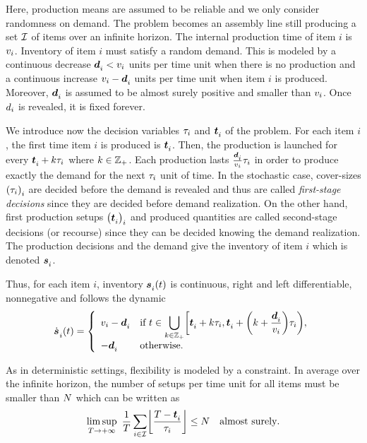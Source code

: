 Here, production means are assumed to be reliable and we only consider randomness on demand.
The problem becomes an assembly line still producing a set $\mathcal{I}$ of items over an infinite horizon.
The internal production time of item $i$ is $v_i$.
Inventory of item $i$ must satisfy a random demand.
This is modeled by a continuous decrease $\va\demand_i<\rate_i$ units per time unit when there is no production and a continuous increase $\rate_i-\va\demand_i$ units per time unit when item $i$ is produced.
Moreover, $\va\demand_i$ is assumed to be almost surely positive and smaller than $v_i$.
Once $d_i$ is revealed, it is fixed forever.



We introduce now the decision variables $\tau_i$ and $\va t_i$ of the problem.
For each item $i$, the first time item $i$ is produced is $\va t_i$.
Then, the production is launched for every $\va t_i+k\cover_i$ where $k\in\mathbb{Z}_+$.
Each production lasts $\frac{\va\demand_i}{\rate_i}\cover_i$ in order to produce exactly the demand for the next $\tau_i$ unit of time.
In the stochastic case, cover-sizes $\bracket{\cover_i}_i$ are decided before the demand is revealed and thus are called \emph{first-stage decisions} since they are decided before demand realization.
On the other hand, first production setups $\bracket{\va t_i}_i$ and produced quantities are called second-stage decisions (or recourse) since they can be decided knowing the demand realization.
The production decisions and the demand give the inventory of item $i$ which is denoted $\va\inventory_i$.



Thus, for each item $i$, inventory $\va\inventory_i\bracket{t}$ is continuous, right and left differentiable, nonnegative and follows the dynamic
\begin{equation}\label{eq:lot-size:single-line:stochastic:motivations:dynamic}
  \dot{\va\inventory}_i\bracket{t} =
  \left\{
  \begin{array}{ll}
  \rate_i-\va\demand_i
  & \ds\mbox{if}\ t\in\bigcup_{k\in\ZZ_+} \left[\va t_i+k\cover_i,\va t_i+\bracket{k+\frac{\va\demand_i}{\rate_i}}\cover_i\right),
  \\
  -\va\demand_i
  & \mbox{otherwise}.
  \end{array}
  \right.
\end{equation}


As in deterministic settings, flexibility is modeled by a constraint.
In average over the infinite horizon, the number of setups per time unit for all items must be smaller than $N$ which can be written as
\begin{equation}\label{eq:lot-size:single-line:stochastic:motivations:flexibility}
  \limsup_{\horizon\rightarrow+\infty}\ \frac{1}{\horizon} \sum_{i\in\REF} \left\lfloor\frac{\horizon-\va t_i}{\cover_i}\right\rfloor \le \nbsetups \quad \mbox{almost surely}.
\end{equation}


